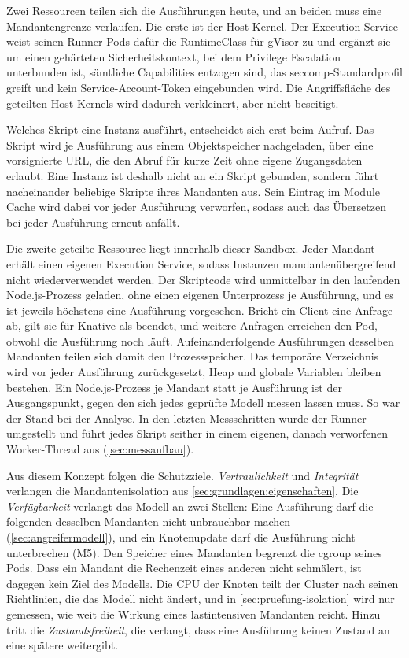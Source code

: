 Zwei Ressourcen teilen sich die Ausführungen heute, und an beiden muss eine Mandantengrenze
verlaufen. Die erste ist der Host-Kernel. Der Execution Service weist seinen Runner-Pods
dafür die RuntimeClass für gVisor zu und ergänzt sie um einen gehärteten Sicherheitskontext, bei
dem Privilege Escalation unterbunden ist, sämtliche Capabilities entzogen sind, das
seccomp-Standardprofil greift und kein Service-Account-Token eingebunden wird. Die Angriffsfläche des geteilten Host-Kernels \autocite[S.~17--18]{souppaya_application_2017} wird dadurch verkleinert, aber nicht beseitigt.

Welches Skript eine Instanz ausführt, entscheidet sich erst beim Aufruf. Das Skript wird je
Ausführung aus einem Objektspeicher nachgeladen, über eine vorsignierte \ac{URL}, die den Abruf für kurze Zeit ohne
eigene Zugangsdaten erlaubt. Eine Instanz ist deshalb nicht an ein Skript gebunden, sondern führt nacheinander
beliebige Skripte ihres Mandanten aus. Sein Eintrag im Module Cache wird dabei vor jeder Ausführung verworfen, sodass
auch das Übersetzen bei jeder Ausführung erneut anfällt.

Die zweite geteilte Ressource liegt innerhalb dieser Sandbox. Jeder Mandant erhält einen eigenen
Execution Service, sodass Instanzen mandantenübergreifend nicht wiederverwendet werden. Der
Skriptcode wird unmittelbar in den laufenden Node.js-Prozess geladen, ohne einen eigenen
Unterprozess je Ausführung, und es ist jeweils höchstens eine Ausführung vorgesehen. Bricht ein
Client eine Anfrage ab, gilt sie für Knative als beendet, und weitere Anfragen erreichen den Pod,
obwohl die Ausführung noch läuft. Aufeinanderfolgende
Ausführungen desselben Mandanten teilen sich damit den Prozessspeicher. Das temporäre Verzeichnis
wird vor jeder Ausführung zurückgesetzt, Heap und globale Variablen bleiben bestehen. Ein
Node.js-Prozess je Mandant statt je Ausführung ist der Ausgangspunkt, gegen den sich jedes
geprüfte Modell messen lassen muss. So war der Stand bei der Analyse. In den letzten Messschritten wurde der Runner umgestellt und führt jedes Skript seither in einem eigenen, danach verworfenen Worker-Thread aus (\autoref{sec:messaufbau}).

Aus diesem Konzept folgen die Schutzziele. \emph{Vertraulichkeit} und \emph{Integrität}
verlangen die Mandantenisolation aus \autoref{sec:grundlagen:eigenschaften}. Die \emph{Verfügbarkeit} verlangt das
Modell an zwei Stellen: Eine Ausführung darf die folgenden desselben Mandanten nicht unbrauchbar machen (\autoref{sec:angreifermodell}), und
ein Knotenupdate darf die Ausführung nicht unterbrechen (M5). Den Speicher eines Mandanten begrenzt die cgroup seines
Pods. Dass ein Mandant die Rechenzeit eines anderen nicht schmälert, ist dagegen kein Ziel des Modells. Die \ac{CPU}
der Knoten teilt der Cluster nach seinen Richtlinien, die das Modell nicht ändert, und in \autoref{sec:pruefung-isolation}
wird nur gemessen, wie weit die Wirkung eines lastintensiven Mandanten reicht. Hinzu tritt die \emph{Zustandsfreiheit}, die verlangt, dass eine Ausführung
keinen Zustand an eine spätere weitergibt.


